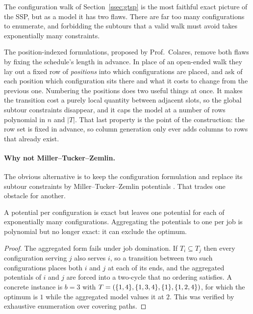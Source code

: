 The configuration walk of Section~\ref{ssec:gtsp} is the most faithful exact picture
of the SSP, but as a model it has two flaws. There are far too many configurations to
enumerate, and forbidding the subtours that a valid walk must avoid takes exponentially
many constraints.

The position-indexed formulations, proposed by Prof.~Colares, remove both flaws by
fixing the schedule's length in advance. In place of an open-ended walk they lay out a
fixed row of \emph{positions} into which configurations are placed, and ask of each
position which configuration sits there and what it costs to change from the previous
one. Numbering the positions does two useful things at once. It makes the transition
cost a purely local quantity between adjacent slots, so the global subtour constraints
disappear, and it caps the model at a number of rows polynomial in $n$ and
$\lvert T\rvert$. That last property is the point of the construction: the row set is
fixed in advance, so column generation only ever adds columns to rows that already
exist.

\paragraph{Why not Miller--Tucker--Zemlin.}
The obvious alternative is to keep the configuration formulation and replace its
subtour constraints by Miller--Tucker--Zemlin potentials
\citep{Miller1960,DesrochersLaporte1991}. That trades one obstacle for another.

\begin{proposition}\label{prop:mtz}
A potential per configuration is exact but leaves one potential for each of
exponentially many configurations. Aggregating the potentials to one per job is
polynomial but no longer exact: it can exclude the optimum.
\end{proposition}

\begin{proof}
The aggregated form fails under job domination. If $T_i\subseteq T_j$ then every
configuration serving $j$ also serves $i$, so a transition between two such
configurations places both $i$ and $j$ at each of its ends, and the aggregated
potentials of $i$ and $j$ are forced into a two-cycle that no ordering satisfies. A
concrete instance is $b=3$ with $T=(\{1,4\},\{1,3,4\},\{1\},\{1,2,4\})$,
for which the optimum is $1$ while the aggregated model values it at $2$. This was
verified by exhaustive enumeration over covering paths.
\end{proof}

